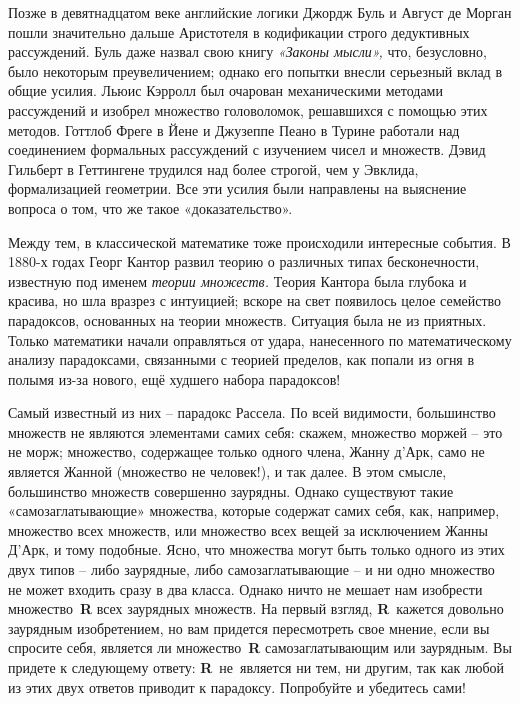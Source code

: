 \documentclass[../main.tex]{subfiles}
\begin{document}
Позже в девятнадцатом веке английские логики Джордж Буль и Август де Морган пошли значительно дальше Аристотеля в кодификации строго дедуктивных рассуждений. Буль даже назвал свою книгу \emph{«Законы мысли»,} что, безусловно, было некоторым преувеличением; однако его попытки внесли серьезный вклад в общие усилия. Льюис Кэрролл был очарован механическими методами рассуждений и изобрел множество головоломок, решавшихся с помощью этих методов. Готтлоб Фреге в Йене и Джузеппе Пеано в Турине работали над соединением формальных рассуждений с изучением чисел и множеств. Дэвид Гильберт в Геттингене трудился над более строгой, чем у Эвклида, формализацией геометрии. Все эти усилия были направлены на выяснение вопроса о том, что же такое «доказательство».

Между тем, в классической математике тоже происходили интересные события. В 1880-х годах Георг Кантор развил теорию о различных типах бесконечности, известную под именем \emph{теории множеств.} Теория Кантора была глубока и красива, но шла вразрез с интуицией; вскоре на свет появилось целое семейство парадоксов, основанных на теории множеств. Ситуация была не из приятных. Только математики начали оправляться от удара, нанесенного по математическому анализу парадоксами, связанными с теорией пределов, как попали из огня в полымя из-за нового, ещё худшего набора парадоксов!

Самый известный из них \--- парадокс Рассела. По всей видимости, большинство множеств не являются элементами самих себя: скажем, множество моржей \--- это не морж; множество, содержащее только одного члена, Жанну д'Арк, само не является Жанной (множество не человек!), и так далее. В этом смысле, большинство множеств совершенно заурядны. Однако существуют такие «самозаглатывающие» множества, которые содержат самих себя, как, например, множество всех множеств, или множество всех вещей за исключением Жанны Д'Арк, и тому подобные. Ясно, что множества могут быть только одного из этих двух типов \--- либо заурядные, либо самозаглатывающие \--- и ни одно множество не может входить сразу в два класса. Однако ничто не мешает нам изобрести множество~\textbf{R} всех заурядных множеств. На первый взгляд, \textbf{R}~кажется довольно заурядным изобретением, но вам придется пересмотреть свое мнение, если вы спросите себя, является ли множество~\textbf{R} самозаглатывающим или заурядным. Вы придете к следующему ответу: \textbf{R}~не~является ни тем, ни другим, так как любой из этих двух ответов приводит к парадоксу. Попробуйте и убедитесь сами!
\end{document}

